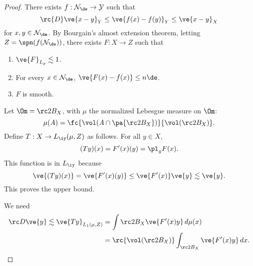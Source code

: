 



\begin{proof}
There exists $f:\cal N_\de\to Y$ such that 
\[
\rc{D} \ve{x-y}_Y\le \ve{f(x)-f(y)}_Y \le \ve{x-y}_X
\]
for $x,y\in \cal N_\de$. By Bourgain's almost extension theorem, letting $Z=\spn(f(\cal N_\de))$, there exists $F:X\to Z$ such that
\begin{enumerate}
\item
$\ve{F}_{L_p}\lesssim1$.
\item
For every $x\in \cal N_\de$, $\ve{F(x)-f(x)}\le n\de$.
\item
$F$ is smooth.
\end{enumerate}

Let $\Om=\rc2B_X$, with $\mu$ the normalized Lebesgue measure on $\Om$:
\[
\mu(A) = \fc{\vol(A\cap \pa{\rc 2B_X})}{\vol(\rc 2B_X)}.
\]
Define $T:X\to L_{\iy}(\mu, Z)$ as follows. For all $y\in X$, 
\[
(Ty)(x) = F'(x)(y)=\pl_yF(x).
\]
This function is in $L_\iy$ because
\[
\ve{(Ty)(x)}=\ve{F'(x)(y)} \le \ve{F'(x)}\ve{y}\lesssim \ve{y}.
\]
This proves the upper bound.

We need 
\begin{align*}
\rc D \ve{y} \lesssim \ve{Ty}_{L_1(\mu,Z)} 
&= \int{\rc2B_X} \ve{F'(x)y} \,d\mu(x) \\
&=\rc{\vol(\rc2 B_X)}\int_{\rc 2B_X}\ve{F'(x)y}\,dx.
\end{align*}


\end{proof}
